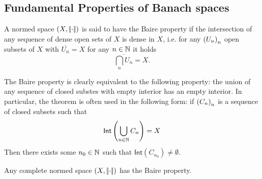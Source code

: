 \documentclass{article}
\begin{document}
\subsection{Fundamental Properties of Banach spaces}
\begin{definition}
	A normed space $\left(X,\left|\negthinspace\left|\cdot\right|\negthinspace\right|\right)$ is said to have the Baire property if the intersection of any sequence of dense open sets of $X$ is dense in $X$, i.e. for any ${\left({U}_{n}\right)}_{n}$ open subsets of $X$ with $\overline{U_{n}}=X$ for any $n\in\mathbb{N}$ it holds
	\begin{equation*}
		\overline{\bigcap_{n}U_{n}}=X.
	\end{equation*}
\end{definition}
The Baire property is clearly equivalent to the following property: the union of any sequence of closed substes with empty interior has an empty interior. In particular, the theorem is often used in the following form: if ${\left({C}_{n}\right)}_{n}$ is a sequence of closed subsets such that 
\begin{equation*}
	\mathsf{Int}\left(\bigcup_{n\in\mathbb{N}}C_{n}\right)=X
\end{equation*}
Then there exists some $n_{0}\in\mathbb{N}$ such that $\mathsf{Int}(C_{n_{0}})\neq\emptyset$.
\begin{theorem}
	Any complete normed space $\left(X,\left|\negthinspace\left|\cdot\right|\negthinspace\right|\right)$ has the Baire property.
\end{theorem}
\end{document}
